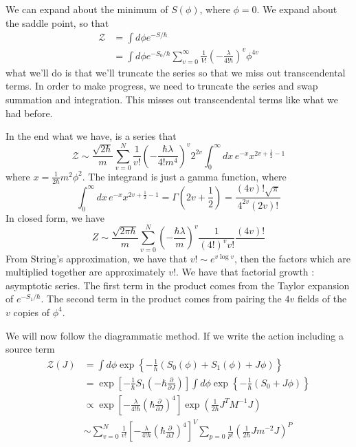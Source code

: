 \documentclass[11pt, oneside]{article}   	%
\theoremstyle{slanted}
\begin{document}
We can expand about the minimum of $ S \left( \phi  \right)  $, 
where $ \phi  = 0 $. 
We expand about the saddle point, so that 
\begin{align*}
	\mathcal{ Z } &=  \int d \phi e ^{  - S / \hbar }  \\
	&=  \int d \phi e ^{  - S_0 / \hbar } \sum_{ v  = 0  } ^{ \infty } 
	\frac{1}{ V! } \left(  - \frac{\lambda}{4 !  \hbar }  \right) ^{ v } \phi ^{ 4 v } 
\end{align*}
what we'll do is that we'll truncate the series 
so that we miss out transcendental terms. 
In order to make progress, we need to 
truncate the series and swap summation and integration. 
This misses out transcendental terms 
like what we had before.  

In the end what we have, is a series that 
\[
 \mathcal{ Z } \sim \frac{\sqrt{ 2 \hbar }  }{ m } \sum_{ v = 0 }^{ N } \frac{1}{v ! } 
 \left(  - \frac{\hbar \lambda }{ 4 ! m ^ 4   }  \right)^ v 2 ^{ 2v } 
 \int _ 0 ^ \infty d x \, e ^{ - x } x^{ 2v + \frac{1}{2 }  - 1 } 
\]  where $ x  = \frac{1}{ 2 \hbar } m ^ 2 \phi ^ 2 $. 
The integrand is just a gamma function, where 
\[
 \int _ 0 ^{ \infty } dx \, e ^{ - x } x ^{ 2 v + \frac{1}{2 } - 1 } 
 = \Gamma \left(  2v + \frac{1}{2 }  \right)   = \frac{ \left( 4v  \right)  ! 
 \sqrt{ \pi }  }{ 4 ^{ 2v } \left( 2v  \right)  ! }
\] In closed form, we have 
\[
 Z \sim \frac{ \sqrt{ 2 \pi \hbar }  }{ m } 
 \sum _{ v = 0 }^{ N } \left(  - \frac{ \hbar \lambda  }{ m }  \right)^{ v } 
 \frac{1}{\left( 4 !  \right)  ^{ v } v ! } \frac{\left( 4v   \right) ! }{ }
\] From String's approximation, 
we have that $ v ! \sim e ^{ v \log v } $, 
then the factors which are multiplied together 
are approximately $ v ! $. 
We have that factorial growth : asymptotic series. 
The first term in the 
product comes from the Taylor expansion of $ e ^{  - S _ 1  / \hbar  } $. 
The second term in the product comes from pairing 
the $ 4 v $ fields of the $ v $ copies of $ \phi ^ 4 $. 

We will now follow the diagrammatic 
method. 
If we write the action 
including a source term 
\begin{align*}
	\mathcal{ Z } \left( J  \right)  & = \int d \phi  \exp \left\{  
	-\frac{1}{\hbar } \left( S _ 0 \left( \phi  \right)  + S _ 1 \left( \phi  \right)  
+ J \phi \right)   \right\} \\
					 &=  \exp \left[  - \frac{1}{\hbar } S_ 1 \left(  - \hbar \frac{\partial }{\partial  J }  \right)  \right] \int 
					 d \phi \exp \left\{  
					 - \frac{1}{\hbar } \left( 
				 S_ 0 + J \phi \right) \right\} \\
				 & \propto 
				 \exp \left[  
				 - \frac{ \lambda  }{ 4 ! \hbar } \left( 
			 \hbar \frac{\partial  }{\partial  J }  \right)  ^ 4 \right]
			 \exp \left( \frac{1}{ 2 \hbar  } J ^ T 
			 M ^{ - 1 } J \right) \\
			 & \sim \sum_{ v  =0 } ^ N \frac{1}{ v ! } 
			 \left[   - \frac{ \lambda }{ 4 ! \hbar } \left( 
			 \hbar \frac{\partial  }{\partial  J }   \right) ^ 4   \right] ^ V 
			 \sum_{ p = 0  } \frac{1}{p !  } \left( \frac{1}{ 2 \hbar } J m ^{ - 2 }  J \right) ^ P  
\end{align*}
\end{document}
